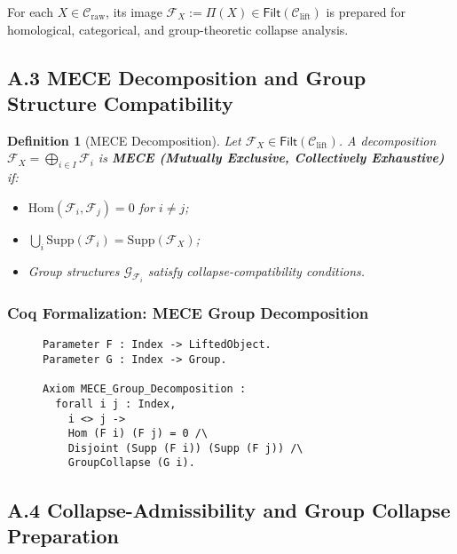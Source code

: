 \documentclass[11pt]{article}
\newtheorem{definition}[theorem]{Definition}
\begin{document}
For each \( X \in \mathcal{C}_{\mathrm{raw}} \), its image \( \mathcal{F}_X := \Pi(X) \in \mathsf{Filt}(\mathcal{C}_{\mathrm{lift}}) \) is prepared for homological, categorical, and group-theoretic collapse analysis.

\subsection*{A.3 MECE Decomposition and Group Structure Compatibility}

\begin{definition}[MECE Decomposition]
Let \( \mathcal{F}_X \in \mathsf{Filt}(\mathcal{C}_{\mathrm{lift}}) \). A decomposition \( \mathcal{F}_X = \bigoplus_{i \in I} \mathcal{F}_i \) is \textbf{MECE (Mutually Exclusive, Collectively Exhaustive)} if:

\begin{itemize}
    \item \( \mathrm{Hom}(\mathcal{F}_i, \mathcal{F}_j) = 0 \) for \( i \neq j \);
    \item \( \bigcup_i \mathrm{Supp}(\mathcal{F}_i) = \mathrm{Supp}(\mathcal{F}_X) \);
    \item Group structures \( \mathcal{G}_{\mathcal{F}_i} \) satisfy collapse-compatibility conditions.
\end{itemize}
\end{definition}

\subsubsection*{Coq Formalization: MECE Group Decomposition}

\begin{figure}[h]
\centering
\begin{lstlisting}[language=Coq, caption=Group-Compatible MECE Decomposition]
Parameter F : Index -> LiftedObject.
Parameter G : Index -> Group.

Axiom MECE_Group_Decomposition :
  forall i j : Index,
    i <> j ->
    Hom (F i) (F j) = 0 /\
    Disjoint (Supp (F i)) (Supp (F j)) /\
    GroupCollapse (G i).
\end{lstlisting}
\end{figure}


\subsection*{A.4 Collapse-Admissibility and Group Collapse Preparation}
\end{document}
